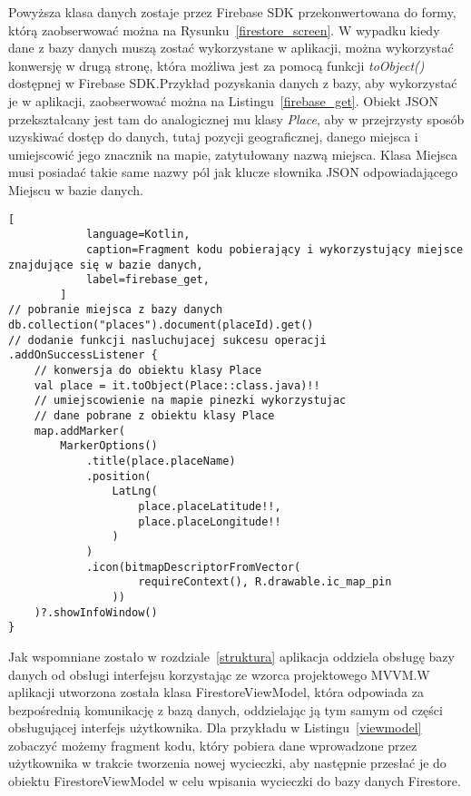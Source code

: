         Powyższa klasa danych zostaje przez Firebase SDK przekonwertowana do formy, którą zaobserwować można na Rysunku~\ref{firestore_screen}. W wypadku kiedy dane z bazy danych muszą zostać wykorzystane
        w aplikacji, można wykorzystać konwersję w drugą stronę, która możliwa jest za pomocą funkcji \emph{toObject\!()} dostępnej w Firebase SDK.\@ Przykład pozyskania danych z bazy, aby wykorzystać je w
        aplikacji, zaobserwować można na Listingu~\ref{firebase_get}. Obiekt JSON przekształcany jest tam do analogicznej mu klasy \emph{Place}, aby w przejrzysty sposób uzyskiwać dostęp do danych, tutaj
        pozycji geograficznej, danego miejsca i umiejscowić jego znacznik na mapie, zatytułowany nazwą miejsca. Klasa Miejsca musi posiadać takie same nazwy pól jak klucze słownika JSON odpowiadającego
        Miejscu w bazie danych.

\newpage
        \begin{lstlisting}[
            language=Kotlin, 
            caption=Fragment kodu pobierający i wykorzystujący miejsce znajdujące się w bazie danych, 
            label=firebase_get,
        ]
// pobranie miejsca z bazy danych
db.collection("places").document(placeId).get()
// dodanie funkcji nasluchujacej sukcesu operacji
.addOnSuccessListener {
    // konwersja do obiektu klasy Place
    val place = it.toObject(Place::class.java)!!
    // umiejscowienie na mapie pinezki wykorzystujac 
    // dane pobrane z obiektu klasy Place
    map.addMarker(
        MarkerOptions()
            .title(place.placeName)
            .position(
                LatLng(
                    place.placeLatitude!!, 
                    place.placeLongitude!!
                )
            )
            .icon(bitmapDescriptorFromVector(
                    requireContext(), R.drawable.ic_map_pin
                ))
    )?.showInfoWindow()
}
        \end{lstlisting}
        \vspace{1cm}

        Jak wspomniane zostało w rozdziale~\ref{struktura} aplikacja oddziela obsługę bazy danych od obsługi interfejsu korzystając ze wzorca projektowego MVVM.\@ W aplikacji utworzona została
        klasa FirestoreViewModel, która odpowiada za bezpośrednią komunikację z bazą danych, oddzielając ją tym samym od części obsługującej interfejs użytkownika. Dla przykładu w Listingu~\ref{viewmodel}
        zobaczyć możemy fragment kodu, który pobiera dane wprowadzone przez użytkownika w trakcie tworzenia nowej wycieczki, aby następnie przesłać je do obiektu FirestoreViewModel w celu wpisania wycieczki
        do bazy danych Firestore.


